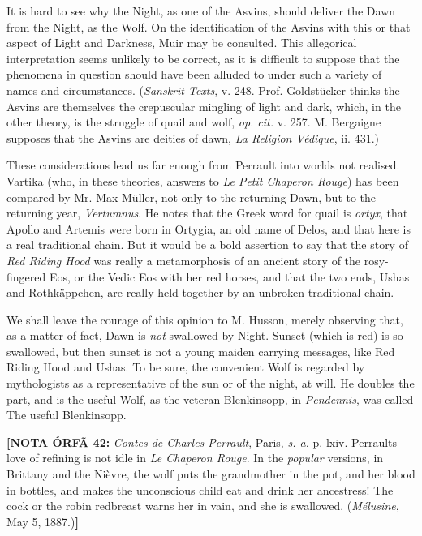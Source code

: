 \documentclass[14pt,a4paper]{memoir}
\begin{document}
{It is hard to see why the Night, as one of the Asvins, should deliver
the Dawn from the Night, as the Wolf. On the identification of the
Asvins with this or that aspect of Light and Darkness, Muir may be
consulted. \textquotesingle This allegorical interpretation seems
unlikely to be correct, as it is difficult to suppose that the phenomena
in question should have been alluded to under such a variety of names
and circumstances.\textquotesingle{} (\emph{Sanskrit Texts}, v. 248.
Prof. Goldstücker thinks the Asvins are themselves the crepuscular
mingling of light and dark, which, in the other theory, is the struggle
of quail and wolf, \emph{op. cit.} v. 257. M. Bergaigne supposes that
the Asvins are deities of dawn, \emph{La Religion Védique}, ii. 431.)

These considerations lead us far enough from Perrault into
\textquotesingle worlds not realised.\textquotesingle{} Vartika (who, in
these theories, answers to \emph{Le Petit Chaperon Rouge}) has been
compared by Mr. Max Müller, not only to the returning Dawn, but to the
returning year, \emph{Vertumnus}. He notes that the Greek word for quail
is \emph{ortyx}, that Apollo and Artemis were born in Ortygia, an old
name of Delos, and that \textquotesingle here is a real traditional
chain.\textquotesingle{} But \textquotesingle it would be a bold
assertion to say that the story of \emph{Red Riding Hood} was really a
metamorphosis of an ancient story of the rosy-fingered Eos, or the Vedic
Eos with her red horses, and that the two ends, Ushas and Rothkäppchen,
are really held together by an unbroken traditional
chain.\textquotesingle{}

We shall leave the courage of this opinion to M. Husson, merely
observing that, as a matter of fact, Dawn is \emph{not} swallowed by
Night. Sunset (which is red) is so swallowed, but then sunset is not
\textquotesingle a young maiden carrying messages,\textquotesingle{}
like Red Riding Hood and Ushas. To be sure, the convenient Wolf is
regarded by mythologists as \textquotesingle a representative of the sun
or of the night,\textquotesingle{} at will. He \textquotesingle doubles
the part,\textquotesingle{} and \textquotesingle is the useful
Wolf,\textquotesingle{} as the veteran Blenkinsopp, in \emph{Pendennis},
was called \textquotesingle The useful Blenkinsopp.\textquotesingle{}

\textbf{[NOTA ÓRFÃ 42:} \emph{Contes de Charles Perrault}, Paris, \emph{s. a.} p. lxiv.
Perrault\textquotesingle s love of refining is not idle in \emph{Le
Chaperon Rouge}. In the \emph{popular} versions, in Brittany and the
Nièvre, the wolf puts the grandmother in the pot, and her blood in
bottles, and makes the unconscious child eat and drink her ancestress!
The cock or the robin redbreast warns her in vain, and she is swallowed.
(\emph{Mélusine}, May 5, 1887.)\textbf{]}

}
\end{document}

